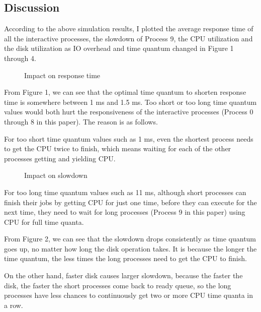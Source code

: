 \documentclass[12pt,letterpaper]{article}
\begin{document}
\subsection{Discussion}
According to the above simulation results, I plotted the average response time of all the interactive processes, the slowdown of Process 9, the CPU utilization and the disk utilization as IO overhead and time quantum changed in Figure 1 through 4.

\begin{figure}[h]
\begin{center}
\caption{Impact on response time}
\end{center}
\end{figure}

From Figure 1, we can see that the optimal time quantum to shorten response time is somewhere between 1 ms and 1.5 ms. Too short or too long time quantum values would both hurt the responsiveness of the interactive processes (Process 0 through 8 in this paper). The reason is as follows.

For too short time quantum values such as 1 ms, even the shortest process needs to get the CPU twice to finish, which means waiting for each of the other processes getting and yielding CPU.

\begin{figure}[h]
\begin{center}
\caption{Impact on slowdown}
\end{center}
\end{figure}

For too long time quantum values such as 11 ms, although short processes can finish their jobs by getting CPU for just one time, before they can execute for the next time, they need to wait for long processes (Process 9 in this paper) using CPU for full time quanta.

From Figure 2, we can see that the slowdown drops consistently as time quantum goes up, no matter how long the disk operation takes. It is because the longer the time quantum, the less times the long processes need to get the CPU to finish. 

On the other hand, faster disk causes larger slowdown, because the faster the disk, the faster the short processes come back to ready queue, so the long processes have less chances to continuously get two or more CPU time quanta in a row.
\end{document}
